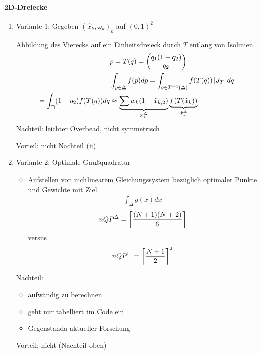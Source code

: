 \paragraph{2D-Dreiecke}
\begin{enumerate}
\item Variante 1: Gegeben $(\hat x_{k}, \omega_{k})_{k}$ auf $(0, 1)^{2}$

Abbildung des Vierecks auf ein Einheitsdreieck durch $T$ entlang von Isolinien.
\begin{align*}
&  p = T(q) =
  \begin{pmatrix}
    q_{1}(1-q_{2})\\ q_{2}
  \end{pmatrix}
\\
& \int_{p \in \Delta} f(p) dp = \int_{q \in T^{-1}(\Delta)} f(T(q))\left|J_{T}\right| dq \\
= \int_{\square} (1-q_{2})f(T(q)) dq
&\approx \underbrace{\sum w_{k}(1- \hat x_{k, 2})}_{\omega_{k}^{\Delta}}\underbrace{f(T(\hat x_{k}))}_{\hat x_{k}^{\Delta}}
\end{align*}
Nachteil: leichter Overhead, nicht symmetrisch

Vorteil: nicht Nachteil (ii)
\item Variante 2: Optimale Gaußquadratur
  \begin{itemize}
  \item Aufstellen von nichlinearem Gleichungssystem bezüglich optimaler Punkte und Gewichte mit Ziel
    \begin{align*}
      \int_{\Delta} g(\underbar x) d\underbar x
    \end{align*}
\begin{align*}
  nQP^{\Delta} = \left \lceil \frac {(N+1)(N+2)}6 \right \rceil
\end{align*}
versus
\begin{align*}
  nQP^{\square} = \left \lceil \frac {N+1}2 \right \rceil^{2}
\end{align*}
  \end{itemize}
Nachteil:
\begin{itemize}
\item aufwändig zu berechnen
\item geht nur tabelliert im Code ein
\item Gegenstanda aktueller Forschung
\end{itemize}
Vorteil: nicht  (Nachteil oben)
\end{enumerate}

